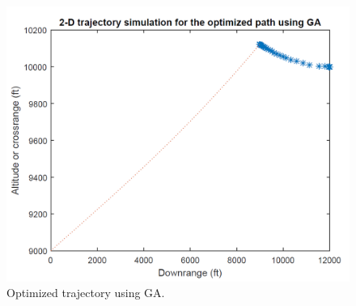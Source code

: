 \begin{figure}[H]
	\centering
	\includegraphics[scale = 0.4]{fig/polyTrajectory.PNG}
	\caption{Optimized trajectory using GA.}
	\label{GA poly trajectory}
\end{figure}


